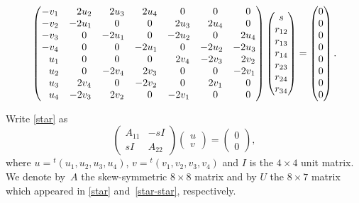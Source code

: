 \documentclass[11pt]{article}
\numberwithin{equation}{section}
\numberwithin{equation}{section}
\theoremstyle{definition}
\newcommand{\0}{\boldsymbol{0}}
\begin{document}
\begin{gather}
\begin{pmatrix}
-v_1 & \hphantom{-}2u_2 & \hphantom{-}2u_3 & \hphantom{-}2u_4 & \hphantom{-}0 & \hphantom{-}0 & \hphantom{-}0
\\
-v_2 & -2u_1 & \hphantom{-}0 & \hphantom{-}0 & \hphantom{-}2u_3 & \hphantom{-}2u_4 & \hphantom{-}0
\\
-v_3 & \hphantom{-}0 & -2u_1 & \hphantom{-}0 & -2u_2 & \hphantom{-}0 & \hphantom{-}2u_4
\\
-v_4 & \hphantom{-}0 & \hphantom{-}0 & -2u_1 & \hphantom{-}0 & -2u_2 & -2u_3
\\
\hphantom{-}u_1 & \hphantom{-}0 & \hphantom{-}0 & \hphantom{-}0 & \hphantom{-}2v_4 & -2v_3 & \hphantom{-}2v_2
\\
\hphantom{-}u_2 & \hphantom{-}0 & -2v_4 & \hphantom{-}2v_3 & \hphantom{-}0 & \hphantom{-}0 & -2v_1
\\
\hphantom{-}u_3 & \hphantom{-}2v_4 & \hphantom{-}0 & -2v_2 & \hphantom{-}0 & \hphantom{-}2v_1 & \hphantom{-}0
\\
\hphantom{-}u_4 & -2v_3 & \hphantom{-}2v_2 & \hphantom{-}0 & -2v_1 & \hphantom{-}0 & \hphantom{-}0
\end{pmatrix}
\begin{pmatrix}
s
\\
r_{12}
\\
r_{13}
\\
r_{14}
\\
r_{23}
\\
r_{24}
\\
r_{34}
\end{pmatrix} =
\begin{pmatrix}
0
\\
0
\\
0
\\
0
\\
0
\\
0
\\
0
\\
0
\end{pmatrix}.\label{star-star}
\end{gather}

Write \eqref{star} as
\[
\begin{pmatrix}
A_{11} & -sI
\\
sI & A_{22}
\end{pmatrix}
\begin{pmatrix}
u
\\
v
\end{pmatrix} =
\begin{pmatrix}
0
\\
0
\end{pmatrix},
\]
where $u = {}^t(u_1, u_2, u_3, u_4)$, $v = {}^t(v_1, v_2, v_3, v_4)$ and $I$ is the $4\times 4$ unit matrix.
We denote by~$A$ the skew-symmetric $8\times 8$ matrix
and by $U$ the $8\times 7$ matrix which appeared in \eqref{star} and~\eqref{star-star}, respectively.
\end{document}
